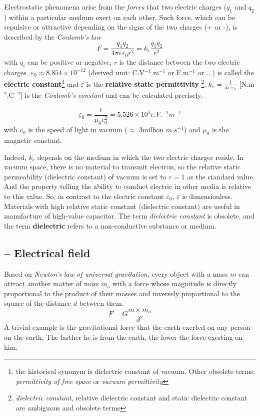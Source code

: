 Electrostatic phenomena arise from the {\it forces} that two electric
charges ($q_1$ and $q_2$) within a particular medium exert on each
other. Such force, which can be repulsive or attractive depending on
the signs of the two charges (+ or -), is described by the
{\it Coulomb's law}
\begin{equation}\label{Coulomb-law}
  F = \frac{q_1q_2}{4\pi \varepsilon \varepsilon_0 r^2} = k_e \frac{q_1q_2}{r^2}
\end{equation}
with $q_i$ can be positive or negative, $r$ is the distance between
the two electric charges. $\varepsilon_0 \approx 8.854\times 10^{-12}$
(derived unit: C.V$^{-1}$.m$^{-1}$ or F.m$^{-1}$ or ...) is called the
{\bf electric
  constant}\footnote{
  the historical synonym is dielectric constant of vacuum. Other
  obsolete terms: {\it permittivity of free space} or
  {\it vacuum permittivity}} and $\varepsilon$ is the
{\bf relative static permittivity}
\footnote{{\it dielectric constant}, relative dielectric constant and
  static dielectric constant are ambiguous and obsolete terms}.
$k_e=\frac{1}{4\pi \varepsilon \varepsilon_0}$ [N.m$^2$.C$^{-2}$] is
the {\it Coulomb's constant} and can be calculated precisely. 

\begin{equation}
  \varepsilon_0 = \frac{1}{\mu_0 c_0^2} = 5.526\times 10^{7} e.V.^{-1}m^{-1}
\end{equation}
with $c_0$ is the speed of light in vacuum ($\approx$ 3million
$m.s^{-1}$) and $\mu_0$ is the magnetic constant.


Indeed, $k_e$ depends on the medium in which the two electric charges
reside. In vacuum space, there is no material to transmit electron, so
the relative static permeability (dielectric constant) of vacuum is
set to $\varepsilon = 1$ as the standard value. And the property
telling the ability to conduct electric in other media is relative to
this value. So, in contrast to the electric constant $\varepsilon_0$,
$\varepsilon$ is dimensionless. Materials with high relative static
constant (dielectric constant) are useful in manufacture of high-value
capacitor.  The term {\it dielectric constant} is obsolete, and the
term {\bf dielectric} refers to a non-conductive substance or medium.

\subsection{-- Electrical field}
\label{sec:electrical-field}

Based on {\it Newton's law of universal gravitation}, every object
with a mass $m$ can attract another matter of mass $m_o$ with a force
whose magnitude is directly proportional to the product of their
masses and inversely proportional to the square of the distance $d$
between them.
\begin{equation}
  \label{eq:33}
  F = G \frac{m\times m_o}{d^2}
\end{equation}
A trivial example is the gravitational force that the earth exerted on
any person on the earth. The farther he is from the earth, the lower
the force exerting on him.

